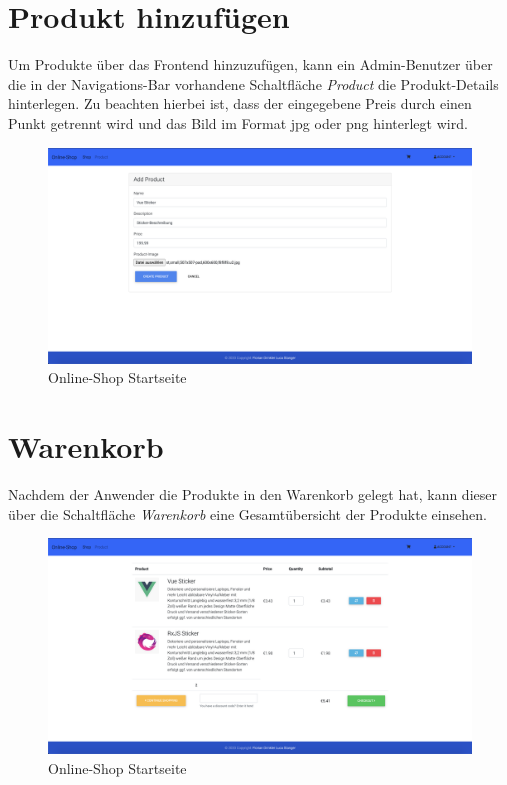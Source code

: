\section{Produkt hinzufügen}

Um Produkte über das Frontend hinzuzufügen, kann ein Admin-Benutzer über die in der Navigations-Bar vorhandene Schaltfläche \emph{Product} die Produkt-Details hinterlegen.
Zu beachten hierbei ist, dass der eingegebene Preis durch einen Punkt getrennt wird und das Bild im Format jpg oder png hinterlegt wird.

\begin{figure}[h]
 \centering
 \includegraphics[width=\textwidth,height=0.6\textheight,keepaspectratio]{images/product-page.png}
 \caption{Online-Shop Startseite}
 \label{fig:product-page}
\end{figure}
\newpage
\section{Warenkorb}

Nachdem der Anwender die Produkte in den Warenkorb gelegt hat, kann dieser über die Schaltfläche \emph{Warenkorb} eine Gesamtübersicht der Produkte einsehen.

\begin{figure}[h]
 \centering
 \includegraphics[width=\textwidth,height=0.6\textheight,keepaspectratio]{images/warenkorb.png}
 \caption{Online-Shop Startseite}
 \label{fig:warenkorb}
\end{figure}

